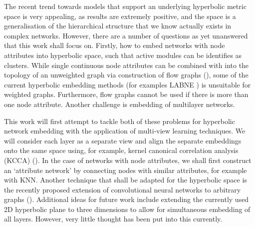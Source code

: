 \documentclass[
11pt, %
english, %
singlespacing, %
headsepline, %
]{MastersDoctoralThesis} %
\begin{document}
The recent trend towards models that support an underlying hyperbolic metric space is very appealing, as results are extremely positive, and the space is a generalisation of the hierarchical structure that we know actually exists in complex networks. However, there are a number of questions as yet unanswered that this work shall focus on. Firstly, how to embed networks with node attributes into hyperbolic space, such that active modules can be identifies as clusters. While single continuous node attributes can be combined with into the topology of an unweighted graph via construction of flow graphs (\cite{ISI:000293452500017}), some of the current hyperbolic embedding methods (for examples LABNE \cite{alanis2016efficient}) is unsuitable for weighted graphs. Furthermore, flow graphs cannot be used if there is more than one node attribute. Another challenge is embedding of multilayer networks.

This work will first attempt to tackle both of these problems for hyperbolic network embedding with the application of multi-view learning techniques. We will consider each layer as a separate view and align the separate embeddings onto the same space using, for example, kernel canonical correlation analysis (KCCA) (\cite{hardoon2004canonical}). In the case of networks with node attributes, we shall first construct an `attribute network' by connecting nodes with similar attributes, for example with KNN. Another technique that shall be adapted for the hyperbolic space is the recently proposed extension of convolutional neural networks to arbitrary graphs (\cite{niepert2016learning}). Additional ideas for future work include extending the currently used 2D hyperbolic plane to three dimensions to allow for simultaneous embedding of all layers. However, very little thought has been put into this currently.
\end{document}
